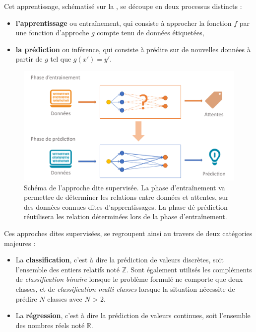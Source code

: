 Cet apprentissage, schématisé sur la , se découpe en deux processus distincts :
\begin{itemize}
    \item \textbf{l’apprentissage} ou entraînement, qui consiste à approcher la fonction $f$ par une fonction d’approche $g$ compte tenu de données étiquetées,
    \item \textbf{la prédiction} ou inférence, qui consiste à prédire sur de nouvelles données à partir de $g$ tel que $g(x') = y'$.
\end{itemize}\par

\begin{figure}[H]
    \centering
    \includegraphics[width=0.8\linewidth]{contents/chapter_3/resources/scheme_supervised_classification.pdf}
    \caption{Schéma de l’approche dite supervisée. La phase d'entraînement va permettre de déterminer les relations entre données et attentes, sur des données connues dites d'apprentissages. La phase dé prédiction réutilisera les relation déterminées lors de la phase d'entraînement. }
    \label{fig:scheme_supervised_classification}
\end{figure}

Ces approches dites supervisées, se regroupent ainsi au travers de deux catégories majeures :
\begin{itemize}
    \item La \textbf{classification}, c'est à dire la prédiction de valeurs discrètes, soit l’ensemble des entiers relatifs noté $\pmb{\mathbb{Z}}$. Sont également utilisés les compléments de \textit{classification binaire} lorsque le problème formulé ne comporte que deux classes, et de \textit{classification multi-classes} lorsque la situation nécessite de prédire $N$ classes avec $N$ > 2.
    \item La \textbf{régression}, c'est à dire la prédiction de valeurs continues, soit l’ensemble des nombres réels noté $\pmb{\mathbb{R}}$.
\end{itemize}\par


